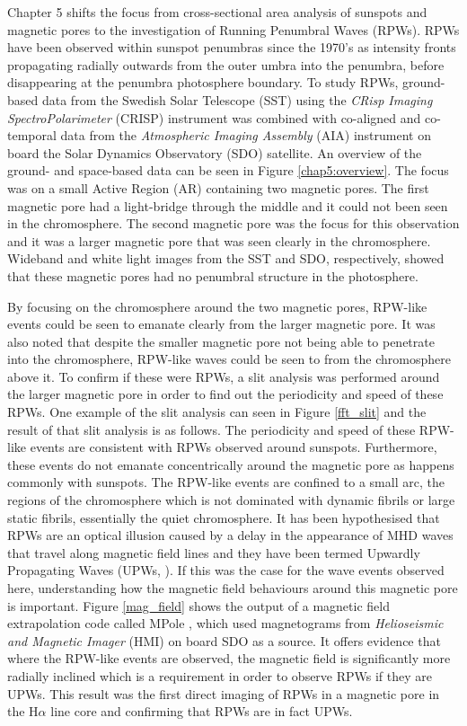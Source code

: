     Chapter 5 shifts the focus from cross-sectional area analysis of sunspots and magnetic pores to the investigation of Running Penumbral Waves (RPWs).
    RPWs have been observed within sunspot penumbras since the 1970's as intensity fronts propagating radially outwards from the outer umbra into the penumbra, before disappearing at the penumbra photosphere boundary.
    To study RPWs, ground-based data from the Swedish Solar Telescope (SST) using the \textit{CRisp Imaging SpectroPolarimeter} (CRISP) instrument was combined with co-aligned and co-temporal data from the \textit{Atmospheric Imaging Assembly} (AIA) instrument on board the Solar Dynamics Observatory (SDO) satellite.
    An overview of the ground- and space-based data can be seen in Figure \ref{chap5:overview}.
    The focus was on a small Active Region (AR) containing two magnetic pores.
    The first magnetic pore had a light-bridge through the middle and it could not been seen in the chromosphere.
    The second magnetic pore was the focus for this observation and it was a larger magnetic pore that was seen clearly in the chromosphere. 
    Wideband and white light images from the SST and SDO, respectively, showed that these magnetic pores had no penumbral structure in the photosphere.
    
    By focusing on the chromosphere around the two magnetic pores, RPW-like events could be seen to emanate clearly from the larger magnetic pore.
    It was also noted that despite the smaller magnetic pore not being able to penetrate into the chromosphere, RPW-like waves could be seen to from the chromosphere above it. 
    To confirm if these were RPWs, a slit analysis was performed around the larger magnetic pore in order to find out the periodicity and speed of these RPWs.
    One example of the slit analysis can seen in Figure \ref{fft_slit} and the result of that slit analysis is as follows.
    The periodicity and speed of these RPW-like events are consistent with RPWs observed around sunspots.
    Furthermore, these events do not emanate concentrically around the magnetic pore as happens commonly with sunspots.
    The RPW-like events are confined to a small arc, the regions of the chromosphere which is not dominated with dynamic fibrils or large static fibrils, essentially the quiet chromosphere.
    It has been hypothesised that RPWs are an optical illusion caused by a delay in the appearance of MHD waves that travel along magnetic field lines and they have been termed Upwardly Propagating Waves (UPWs, \citealt{Bloomfiel2008}).
    If this was the case for the wave events observed here, understanding how the magnetic field behaviours around this magnetic pore is important. 
	Figure \ref{mag_field} shows the output of a magnetic field extrapolation code called MPole \citep{Longcope1996,Longcope2002}, which used magnetograms from \textit{Helioseismic and Magnetic Imager} (HMI) on board SDO as a source.
	It offers evidence that where the RPW-like events are observed, the magnetic field is significantly more radially inclined which is a requirement in order to observe RPWs if they are UPWs. 
	This result was the first direct imaging of RPWs in a magnetic pore in the H$\alpha$ line core and confirming that RPWs are in fact UPWs.
	 
